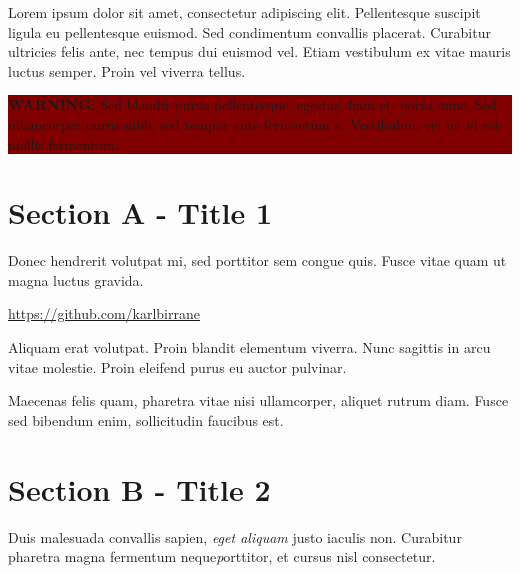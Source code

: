 \documentclass[10.5pt,a5paper]{article} %
\begin{document}
\begin{multicols*}{2} %

Lorem ipsum dolor sit amet, consectetur adipiscing elit. Pellentesque suscipit ligula eu pellentesque euismod. Sed condimentum convallis placerat. Curabitur ultricies felis ante, nec tempus dui euismod vel. Etiam vestibulum ex vitae mauris luctus semper. Proin vel viverra tellus.

\begin{center}
	\vspace{0.25cm} %
	\colorbox{Maroon}{ %
			\begin{minipage}{5cm}
			\color{white} %
			\vspace{0.1cm} %
			\textbf{WARNING:} Sed blandit purus pellentesque, egestas diam et, porta nunc. Sed ullamcorper purus nibh, sed tempor ante fermentum a. Vestibulum vel mi id est mollis fermentum. %
			\vspace{0.1cm} %
		\end{minipage}
	}
\end{center}


\section*{Section A - Title 1}
Donec hendrerit volutpat mi, sed porttitor sem congue quis. Fusce vitae quam ut magna luctus gravida.

\begin{center}
	\url{https://github.com/karlbirrane} %
\end{center}

Aliquam erat volutpat. Proin blandit elementum viverra. Nunc sagittis in arcu vitae molestie. Proin eleifend purus eu auctor pulvinar. 

Maecenas felis quam, pharetra vitae nisi ullamcorper, aliquet rutrum diam. Fusce sed bibendum enim, sollicitudin faucibus est.



\section*{Section B - Title 2}

Duis malesuada convallis sapien, \textit{eget aliquam} justo iaculis non. Curabitur pharetra magna {fermentum neque}\textit porttitor, et cursus nisl consectetur. %









\end{multicols*}
\end{document}

